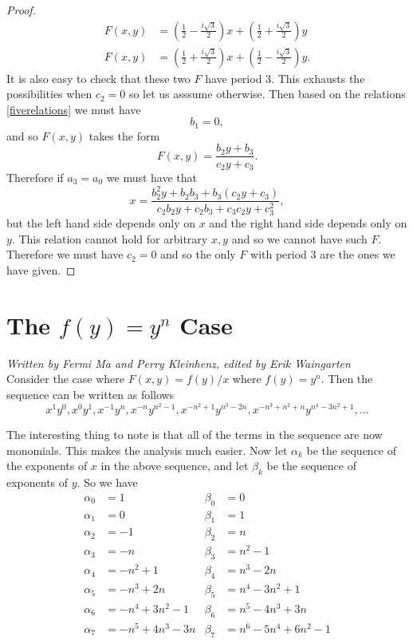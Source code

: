 \documentclass[12pt]{article}
\begin{document}
\begin{proof}
\begin{align*}
F(x,y) &= \left( \frac{1}{2} -\frac{i\sqrt{3}}{2} \right) x + \left( \frac{1}{2} +\frac{i\sqrt{3}}{2} \right) y \\
F(x,y) &= \left( \frac{1}{2} +\frac{i\sqrt{3}}{2} \right) x + \left( \frac{1}{2} -\frac{i\sqrt{3}}{2} \right) y.
\end{align*}
It is also easy to check that these two $F$ have period 3. This exhausts the possibilities when $c_2=0$ so let us asssume otherwise. Then based on the relations \ref{fiverelations} we must have 
\begin{equation*}
b_1 = 0,
\end{equation*}
and so $F(x,y)$ takes the form 
\begin{equation*}
F(x,y) = \frac{b_2 y + b_3}{c_2 y + c_3}.
\end{equation*}
Therefore if $a_3 = a_0$ we must have that 
\begin{equation*}
x = \frac{ b_2^2 y + b_2b_3 +b_3(c_2 y + c_3)}{c_2 b_2 y + c_2 b_3 + c_3 c_2 y + c_3^2},
\end{equation*}
but the left hand side depends only on $x$ and the right hand side depends only on $y$. This relation cannot hold for arbitrary $x,y$ and so we cannot have such $F$. Therefore we must have $c_2=0$ and so the only $F$ with period 3 are the ones we have given. 
\end{proof}


\section{The $f(y) = y^n$ Case}
\label{general case}

\emph{Written by Fermi Ma and Perry Kleinhenz, edited by Erik Waingarten}\\

Consider the case where $F(x,y) = f(y)/x$ where $f(y) = y^n$. Then the sequence can be written as follows
\[ x^1y^0, x^0y^1, x^{-1}y^{n}, x^{-n}y^{n^2-1}, x^{-n^2+1}y^{n^3-2n},x^{-n^3+n^2+n}y^{n^4-3n^2+1}, \dots \]

The interesting thing to note is that all of the terms in the sequence are now monomials. This makes the analysis much easier. Now let $\alpha_k$ be the sequence of the exponents of $x$ in the above sequence, and let $\beta_k$ be the sequence of exponents of $y$. So we have
\begin{align*}
\alpha_0 &= 1  &\beta_0& = 0\\
\alpha_1 &= 0 &\beta_1& = 1\\
\alpha_2 &= -1  &\beta_2& = n\\
\alpha_3 &= -n &\beta_3& = n^2-1\\
\alpha_4 &= -n^2+1 &\beta_4& = n^3-2n\\
\alpha_5 &= -n^3+2n &\beta_5& =n^4-3n^2+1\\ 
\alpha_6 &= -n^4+3n^2 -1 &\beta_6& =n^5-4n^3+3n \\ 
\alpha_7 &= -n^5+4n^3 - 3n &\beta_7& =n^6-5n^4+6n^2 - 1
\end{align*}
\end{document}
